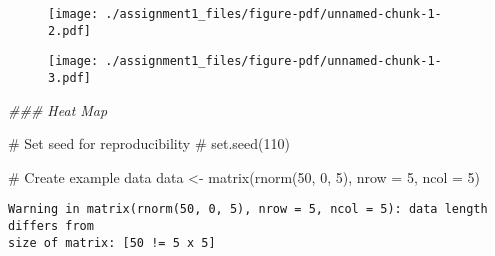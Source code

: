 \documentclass[
  letterpaper,
  DIV=11,
  numbers=noendperiod]{scrreprt}
\newenvironment{Shaded}{\begin{snugshade}}{\end{snugshade}}
\newcommand{\AttributeTok}[1]{\textcolor[rgb]{0.40,0.45,0.13}{#1}}
\newcommand{\CommentTok}[1]{\textcolor[rgb]{0.37,0.37,0.37}{#1}}
\newcommand{\DecValTok}[1]{\textcolor[rgb]{0.68,0.00,0.00}{#1}}
\newcommand{\DocumentationTok}[1]{\textcolor[rgb]{0.37,0.37,0.37}{\textit{#1}}}
\newcommand{\FunctionTok}[1]{\textcolor[rgb]{0.28,0.35,0.67}{#1}}
\newcommand{\NormalTok}[1]{\textcolor[rgb]{0.00,0.23,0.31}{#1}}
\newcommand{\OtherTok}[1]{\textcolor[rgb]{0.00,0.23,0.31}{#1}}
\newcommand{\SpecialCharTok}[1]{\textcolor[rgb]{0.37,0.37,0.37}{#1}}
\newcommand{\StringTok}[1]{\textcolor[rgb]{0.13,0.47,0.30}{#1}}
\begin{document}
\begin{figure}[H]

{\centering \texttt{[image: ./assignment1\_files/figure-pdf/unnamed-chunk-1-2.pdf]}

}

\end{figure}

\begin{Shaded}
\end{Shaded}

\begin{figure}[H]

{\centering \texttt{[image: ./assignment1\_files/figure-pdf/unnamed-chunk-1-3.pdf]}

}

\end{figure}

\begin{Shaded}
\begin{Highlighting}[]
\DocumentationTok{\#\#\# Heat Map}

\CommentTok{\# Set seed for reproducibility}
\CommentTok{\# set.seed(110)}
  
\CommentTok{\# Create example data}
\NormalTok{data }\OtherTok{\textless{}{-}} \FunctionTok{matrix}\NormalTok{(}\FunctionTok{rnorm}\NormalTok{(}\DecValTok{50}\NormalTok{, }\DecValTok{0}\NormalTok{, }\DecValTok{5}\NormalTok{), }\AttributeTok{nrow =} \DecValTok{5}\NormalTok{, }\AttributeTok{ncol =} \DecValTok{5}\NormalTok{)}
\end{Highlighting}
\end{Shaded}

\begin{verbatim}
Warning in matrix(rnorm(50, 0, 5), nrow = 5, ncol = 5): data length differs from
size of matrix: [50 != 5 x 5]
\end{verbatim}
\end{document}
